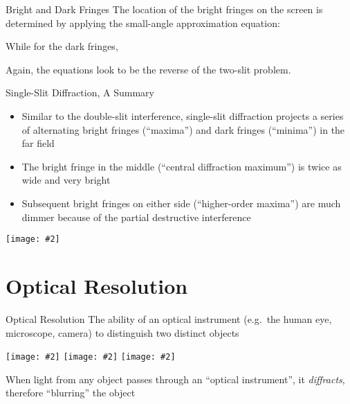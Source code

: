 \documentclass[12pt,compress,aspectratio=169]{beamer}
\newcommand{\pic}[2]{\texttt{[image: \#2]}}
\newcommand{\eq}[2]{\vspace{#1}{\LARGE\begin{displaymath}#2\end{displaymath}}}
\begin{document}
\begin{frame}{Bright and Dark Fringes}
  The location of the bright fringes on the screen is determined by applying
  the small-angle approximation equation:
  
  \eq{-.2in}{
    \boxed{y_m=\left(m+\frac{1}{2}\right)\frac{\lambda L}{W}}
  }

  While for the dark fringes, 

  \eq{-.2in}{
    \boxed{y_m=\frac{m\lambda L}{W}}
  }

  Again, the equations look to be the reverse of the two-slit problem.
\end{frame}



\begin{frame}{Single-Slit Diffraction, A Summary}
  \begin{itemize}
  \item Similar to the double-slit interference, single-slit diffraction
    projects a series of alternating bright fringes (``maxima'') and dark
    fringes (``minima'') in the far field
  \item The bright fringe in the middle (``central diffraction maximum'') is
    twice as wide  and very bright
  \item Subsequent bright fringes on either side (``higher-order maxima'') are
    much dimmer because of the partial destructive interference
  \end{itemize}
  \begin{center}
    \pic{.5}{graphics/Single_Slit_Diffraction.png}
  \end{center}
\end{frame}



\section{Optical Resolution}

\begin{frame}{Optical Resolution}
  The ability of an optical instrument (e.g.\ the human eye, microscope,
  camera) to distinguish two distinct objects
  \begin{center}
    \pic{.322}{graphics/resolve1.png}\hspace{.05in}
    \pic{.322}{graphics/resolve2.png}\hspace{.05in}
    \pic{.322}{graphics/resolve3.png}\hspace{.05in}
  \end{center}
  When light from any object passes through an ``optical instrument'', it
  \emph{diffracts}, therefore ``blurring'' the object
\end{frame}
\end{document}
